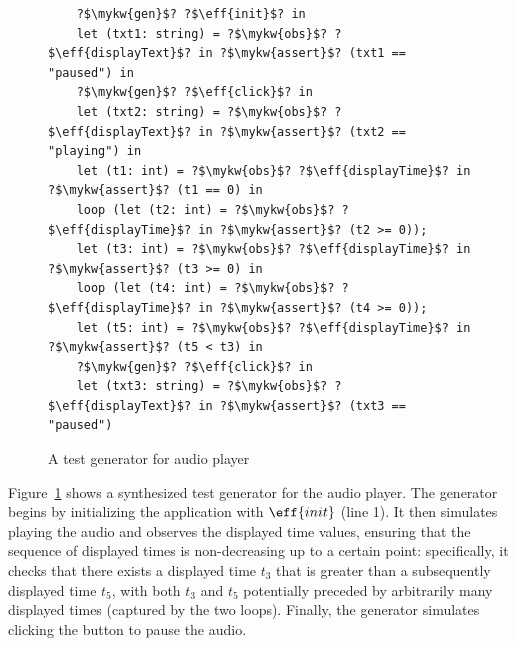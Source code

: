 \begin{figure}[h!]
    \centering
    \begin{verbatim}
    ?$\mykw{gen}$? ?$\eff{init}$? in
    let (txt1: string) = ?$\mykw{obs}$? ?$\eff{displayText}$? in ?$\mykw{assert}$? (txt1 == "paused") in 
    ?$\mykw{gen}$? ?$\eff{click}$? in
    let (txt2: string) = ?$\mykw{obs}$? ?$\eff{displayText}$? in ?$\mykw{assert}$? (txt2 == "playing") in 
    let (t1: int) = ?$\mykw{obs}$? ?$\eff{displayTime}$? in ?$\mykw{assert}$? (t1 == 0) in
    loop (let (t2: int) = ?$\mykw{obs}$? ?$\eff{displayTime}$? in ?$\mykw{assert}$? (t2 >= 0)); 
    let (t3: int) = ?$\mykw{obs}$? ?$\eff{displayTime}$? in ?$\mykw{assert}$? (t3 >= 0) in 
    loop (let (t4: int) = ?$\mykw{obs}$? ?$\eff{displayTime}$? in ?$\mykw{assert}$? (t4 >= 0));
    let (t5: int) = ?$\mykw{obs}$? ?$\eff{displayTime}$? in ?$\mykw{assert}$? (t5 < t3) in
    ?$\mykw{gen}$? ?$\eff{click}$? in
    let (txt3: string) = ?$\mykw{obs}$? ?$\eff{displayText}$? in ?$\mykw{assert}$? (txt3 == "paused")
    \end{verbatim}
    \caption{A test generator for audio player }\label{fig:audio-player-gen}
\end{figure}
    
Figure~\ref{fig:audio-player-gen} shows a synthesized test generator for the audio player. The generator begins by initializing the application with $\eff{init}$ (line 1). It then simulates playing the audio and observes the displayed time values, ensuring that the sequence of displayed times is non-decreasing up to a certain point: specifically, it checks that there exists a displayed time $t_3$ that is greater than a subsequently displayed time $t_5$, with both $t_3$ and $t_5$ potentially preceded by arbitrarily many displayed times (captured by the two loops). Finally, the generator simulates clicking the button to pause the audio.